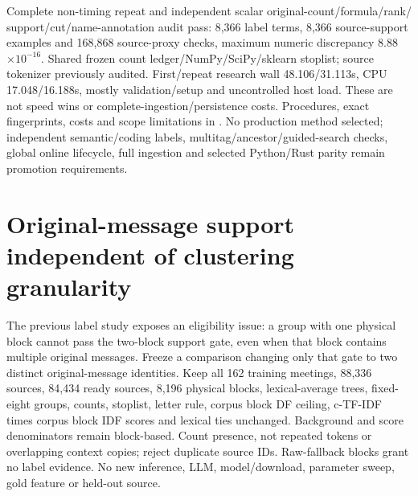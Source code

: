 \documentclass[11pt]{article}
\begin{document}
Complete non-timing repeat and independent scalar original-count/formula/rank/
support/cut/name-annotation audit pass: 8,366 label terms, 8,366 source-support
examples and 168,868 source-proxy checks, maximum numeric discrepancy
8.88$\times10^{-16}$. Shared frozen count ledger/NumPy/SciPy/sklearn stoplist;
source tokenizer previously audited. First/repeat research wall 48.106/31.113s,
CPU 17.048/16.188s, mostly validation/setup and uncontrolled host load. These
are not speed wins or complete-ingestion/persistence costs. Procedures, exact
fingerprints, costs and scope limitations in
. No production method selected;
independent semantic/coding labels, multitag/ancestor/guided-search checks,
global online lifecycle, full ingestion and selected Python/Rust parity remain
promotion requirements.

\section{Original-message support independent of clustering granularity}
The previous label study exposes an eligibility issue: a group with one
physical block cannot pass the two-block support gate, even when that block
contains multiple original messages. Freeze a comparison changing only that
gate to two distinct original-message identities. Keep all 162 training
meetings, 88,336 sources, 84,434 ready sources, 8,196 physical blocks,
lexical-average trees, fixed-eight groups, counts, stoplist, letter rule,
corpus block DF ceiling, c-TF-IDF times corpus block IDF scores and lexical
ties unchanged. Background and score denominators remain block-based. Count
presence, not repeated tokens or overlapping context copies; reject duplicate
source IDs. Raw-fallback blocks grant no label evidence. No new inference,
LLM, model/download, parameter sweep, gold feature or held-out source.
\end{document}
